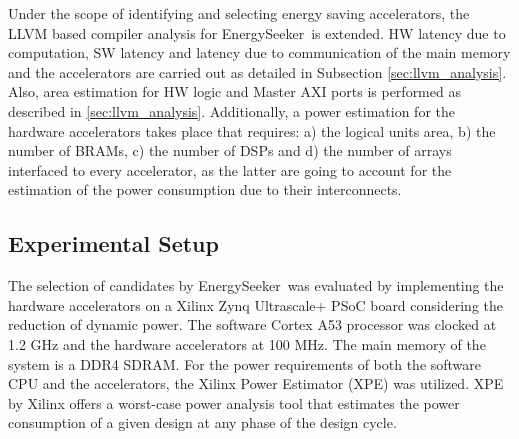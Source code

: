 \documentclass[]{usiinfthesis}
\newcommand{\eseeker}{{EnergySeeker}}
\begin{document}



Under the scope of identifying and selecting energy saving accelerators, the LLVM based compiler 
analysis for \eseeker\ is extended. HW latency due to computation, SW latency and latency due to communication
of the main memory and the accelerators are carried out as detailed in Subsection 
\ref{sec:llvm_analysis}. 
Also, area estimation for HW logic and Master AXI ports is performed as described in \ref{sec:llvm_analysis}.
Additionally,
a power estimation for the hardware accelerators takes place that requires: a) the logical
units area, b) the number of BRAMs, c) the number of DSPs and d) the number of arrays interfaced to every 
accelerator, as the latter are going to account for the estimation of the power consumption due to
their interconnects.


\subsection{Experimental Setup}
\label{sec:results_set}

The selection of candidates by \eseeker\ was evaluated by implementing the 
hardware accelerators on a Xilinx Zynq Ultrascale+ PSoC board considering the reduction of 
dynamic power. The software 
Cortex A53 processor was clocked at 1.2 GHz and the hardware accelerators at 100 MHz.
The main memory of the system is a DDR4 SDRAM.
For the power requirements of both the software CPU and the accelerators, the Xilinx
Power Estimator (XPE) \cite{XpeSep19} was utilized. XPE by Xilinx offers a worst-case
power analysis tool that estimates the power consumption of a given design at any 
phase of the design cycle.\par
\end{document}
